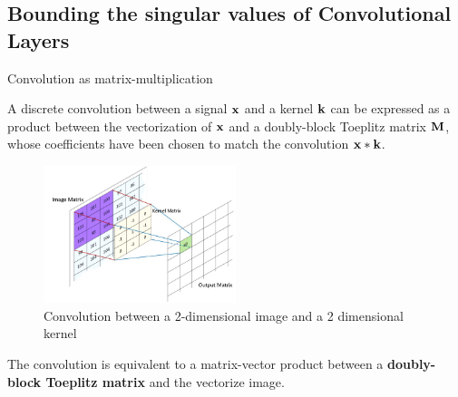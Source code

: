 \subsection{Bounding the singular values of Convolutional Layers}


\begin{frame}{Convolution as matrix-multiplication}

  A discrete convolution between a signal $\mathbf{x}$ and a kernel $\mathbf{k}$ can be expressed as a product between the vectorization of $\mathbf{x}$ and a doubly-block Toeplitz matrix $\mathbf{M}$, whose coefficients have been chosen to match the convolution $\mathbf{x} * \mathbf{k}$.

  \begin{figure}
    \includegraphics[width=0.5\textwidth]{images/convolution.png}
    \caption*{Convolution between a 2-dimensional image and a 2 dimensional kernel}
  \end{figure}

  The convolution is equivalent to a matrix-vector product between a \textbf{doubly-block Toeplitz matrix} and the vectorize image. 

\end{frame}


